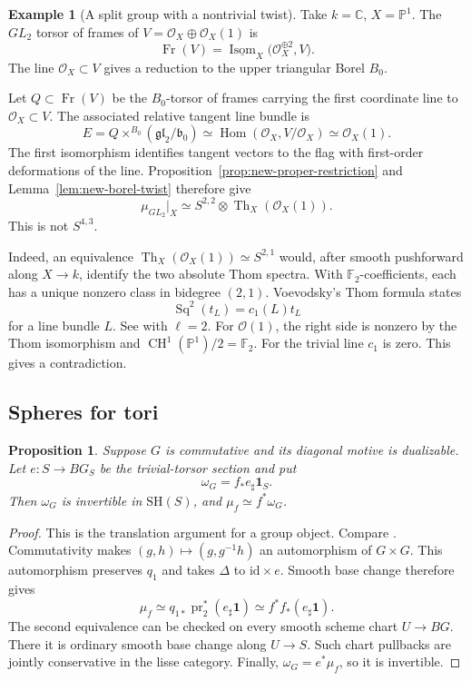 \documentclass[11pt,reqno]{amsart}
\newtheorem{proposition}[theorem]{Proposition}
\theoremstyle{definition}
\newtheorem{example}[theorem]{Example}
\theoremstyle{remark}
\theoremstyle{plain}
\numberwithin{equation}{section}
\newcommand{\SH}{\mathrm{SH}}
\newcommand{\one}{\mathbf 1}
\newcommand{\Pj}{\mathbb P}
\DeclareMathOperator{\Th}{Th}
\begin{document}
\begin{example}[A split group with a nontrivial twist]\label{ex:new-gl2-twist}
Take \(k=\mathbb C\), \(X=\Pj^1\). The \(GL_2\) torsor of frames of
\(V=\mathcal O_X\oplus\mathcal O_X(1)\) is 
\[
\operatorname{Fr}(V)
=
\underline{\operatorname{Isom}}_X
\bigl(\mathcal O_X^{\oplus 2},V\bigr).
\]
The line \(\mathcal O_X\subset V\) gives a reduction to the upper triangular Borel \(B_0\).

Let \(Q\subset\operatorname{Fr}(V)\) be the \(B_0\)-torsor of
frames carrying the first coordinate line to
\(\mathcal O_X\subset V\).
The associated relative tangent line bundle is
\[
 E=Q\times^{B_0}(\mathfrak{gl}_2/\mathfrak b_0)
 \simeq \operatorname{Hom}(\mathcal O_X,V/\mathcal O_X)
 \simeq \mathcal O_X(1).
\]
The first isomorphism identifies tangent vectors to the flag
with first-order deformations of the line.
Proposition~\ref{prop:new-proper-restriction} and
Lemma~\ref{lem:new-borel-twist} therefore give
\[
 \mu_{GL_2}|_X
 \simeq S^{2,2}\otimes\Th_X(\mathcal O_X(1)).
\]
This is not \(S^{4,3}\).

Indeed, an equivalence \(\Th_X(\mathcal O_X(1))\simeq S^{2,1}\) would, 
after smooth pushforward along \(X\to k\), 
identify the two absolute Thom spectra.
With \(\mathbb F_2\)-coefficients, each has a unique nonzero class in bidegree \((2,1)\).
Voevodsky's Thom formula states
\[
 \operatorname{Sq}^2(t_L)=c_1(L)t_L
\]
for a line bundle \(L\). See \cite[Corollary~14.4]{VoevodskyPower} with \(\ell=2\).
For \(\mathcal O(1)\), the right side is nonzero by the Thom isomorphism
\cite[Proposition~4.3]{VoevodskyPower} and
\(\operatorname{CH}^1(\Pj^1)/2=\mathbb F_2\).
For the trivial line \(c_1\) is zero.
This gives a contradiction.
\end{example}

\subsection{Spheres for tori}
\begin{proposition}\label{prop:new-commutative-twist}
Suppose \(G\) is commutative and its diagonal motive is dualizable.
Let \(e:S\to BG_S\) be the trivial-torsor section and put
\[
 \omega_G=f_*e_\sharp\one_S.
\]
Then \(\omega_G\) is invertible in \(\SH(S)\), and \(\mu_f\simeq f^*\omega_G\).
\end{proposition}
\begin{proof}
This is the translation argument for a group object. Compare
\cite[Proposition~1.5.3]{RaksitTate}.
Commutativity makes \((g,h)\mapsto(g,g^{-1}h)\) an automorphism of \(G\times G\).
This automorphism preserves \(q_1\) and takes \(\Delta\) to \(\mathrm{id}\times e\).
Smooth base change therefore gives
\[
 \mu_f\simeq q_{1*}\operatorname{pr}_2^*(e_\sharp\one)
 \simeq f^*f_*(e_\sharp\one).
\]
The second equivalence can be checked on every smooth scheme chart \(U\to BG\).
There it is ordinary smooth base change along \(U\to S\).
Such chart pullbacks are jointly conservative in the lisse category.
Finally, \(\omega_G=e^*\mu_f\), so it is invertible.
\end{proof}
\end{document}
